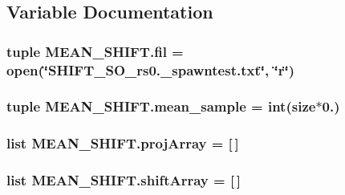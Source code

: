 \subsection{Variable Documentation}
\hypertarget{namespaceMEAN__SHIFT_a8d3baad9fa0bb397ed36b32af03a996c}{
\subsubsection[{fil}]{\setlength{\rightskip}{0pt plus 5cm}tuple M\-E\-A\-N\-\_\-\-S\-H\-I\-F\-T.\-fil = open(\char`\"{}S\-H\-I\-F\-T\-\_\-S\-O\-\_\-rs0.\-\_\-spawntest.\-txt\char`\"{}, \char`\"{}r\char`\"{})}}\label{namespaceMEAN__SHIFT_a8d3baad9fa0bb397ed36b32af03a996c}
\hypertarget{namespaceMEAN__SHIFT_a082081f2418662ad1850a0ac0178eb19}{
\subsubsection[{mean\-\_\-sample}]{\setlength{\rightskip}{0pt plus 5cm}tuple M\-E\-A\-N\-\_\-\-S\-H\-I\-F\-T.\-mean\-\_\-sample = int({\bf size}$\ast$0.)}}\label{namespaceMEAN__SHIFT_a082081f2418662ad1850a0ac0178eb19}
\hypertarget{namespaceMEAN__SHIFT_acb79b39dec43809410d06cd50001c6cc}{
\subsubsection[{proj\-Array}]{\setlength{\rightskip}{0pt plus 5cm}list M\-E\-A\-N\-\_\-\-S\-H\-I\-F\-T.\-proj\-Array = \mbox{[}$\,$\mbox{]}}}\label{namespaceMEAN__SHIFT_acb79b39dec43809410d06cd50001c6cc}
\hypertarget{namespaceMEAN__SHIFT_acb855d2b8fde0351f8cc49e8f804fdce}{
\subsubsection[{shift\-Array}]{\setlength{\rightskip}{0pt plus 5cm}list M\-E\-A\-N\-\_\-\-S\-H\-I\-F\-T.\-shift\-Array = \mbox{[}$\,$\mbox{]}}}\label{namespaceMEAN__SHIFT_acb855d2b8fde0351f8cc49e8f804fdce}

